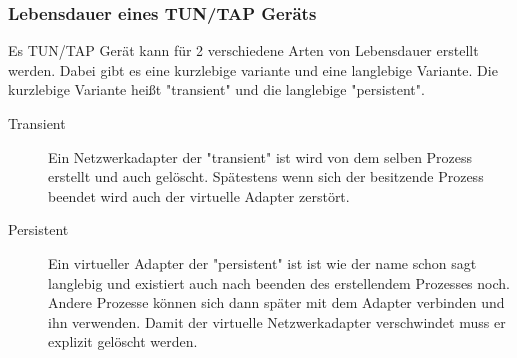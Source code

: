 \subsubsection{Lebensdauer eines TUN/TAP Geräts}
Es TUN/TAP Gerät kann für 2 verschiedene Arten von Lebensdauer erstellt werden. Dabei gibt es eine kurzlebige variante und eine langlebige Variante. Die kurzlebige Variante heißt "transient" und die langlebige "persistent".
\\
\begin{description}
    \item[Transient] Ein Netzwerkadapter der "transient" ist wird von dem selben Prozess erstellt und auch gelöscht. Spätestens wenn sich der besitzende Prozess beendet wird auch der virtuelle Adapter zerstört.
    \item[Persistent] Ein virtueller Adapter der "persistent" ist ist wie der name schon sagt langlebig und existiert auch nach beenden des erstellendem Prozesses noch. Andere Prozesse können sich dann später mit dem Adapter verbinden und ihn verwenden. Damit der virtuelle Netzwerkadapter verschwindet muss er explizit gelöscht werden.
\end{description}

